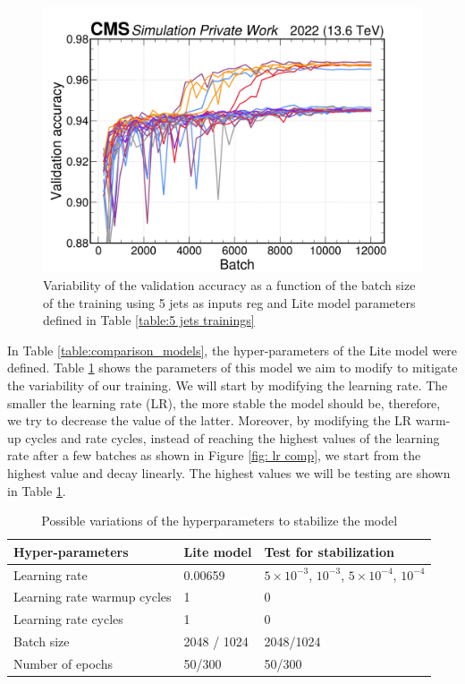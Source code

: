 \begin{figure}[hbt]
    \centering
    \includegraphics[scale=0.1]{Images/6.Improving/Variability Study/5 jets variability study.png}
    \caption{Variability of the validation accuracy as a function of the batch size of the training using 5 jets as inputs \pt reg and Lite model parameters defined in Table \ref{table:5 jets trainings}}
    \label{fig: 5j variability}
\end{figure}

In Table \ref{table:comparison_models}, the hyper-parameters of the Lite model were defined. Table \ref{table: variation hyperpaparm } shows the parameters of this model we aim to modify to mitigate the variability of our training. We will start by modifying the learning rate. The smaller the learning rate (LR), the more stable the model should be, therefore, we try to decrease the value of the latter. Moreover, by modifying the LR warm-up cycles and rate cycles, instead of reaching the highest values of the learning rate after a few batches as shown in Figure \ref{fig: lr comp}, we start from the highest value and decay linearly. The highest values we will be testing are shown in Table \ref{table: variation hyperpaparm }.

\begin{table}[hbt]
\centering
\begin{tabular}{|p{5cm}|p{4cm}|p{5cm}|}
 \hline
 Hyper-parameters  & Lite model & Test for stabilization \\
 \hline
 Learning rate & 0.00659 & $5\times 10^{-3}$, $10^{-3}$, $5\times 10^{-4}$, $10^{-4}$ \\
 \hline
 Learning rate warmup cycles & 1 & 0\\
 \hline
  Learning rate cycles & 1 & 0\\
 \hline
 Batch size & 2048 / 1024 & 2048/1024 \\
 \hline
 Number of epochs & 50/300 & 50/300 \\
 \hline
\end{tabular}
\caption{Possible variations of the hyperparameters to stabilize the model}
\label{table: variation hyperpaparm }
\end{table}

